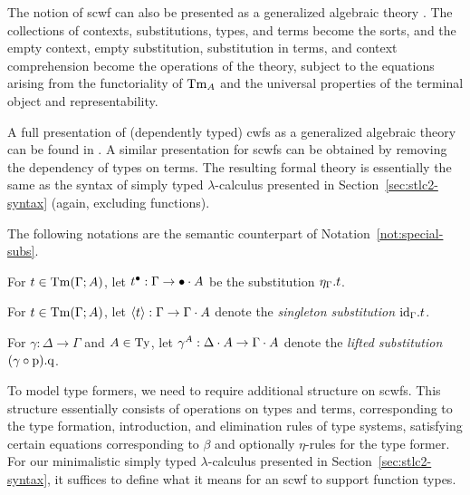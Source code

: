 \begin{rem}
The notion of scwf can also be presented as a generalized algebraic theory \cite{cartmell:1986:apal}. The collections of contexts, substitutions, types, and terms become the sorts, and the empty context, empty substitution, substitution in terms, and context comprehension become the operations of the theory, subject to the equations arising from the functoriality of $\STm{A}$ and the universal properties of the terminal object and representability.

A full presentation of (dependently typed) cwfs as a generalized algebraic theory can be found in \cite{dybjer:1996:types}. A similar presentation for scwfs can be obtained by removing the dependency of types on terms. The resulting formal theory is essentially the same as the syntax of simply typed $\lambda$-calculus presented in Section~\ref{sec:stlc2-syntax} (again, excluding functions).
\end{rem}

The following notations are the semantic counterpart of Notation~\ref{not:special-subs}.
\begin{notn}
\begin{enum}
\item For $t \in \STm[\Gamma]{A}$, let $\Stmsub{t} : \Gamma \to \Sextcon{\Sempcon}{A}$ be the substitution $\Sextsub{\Sempsub[\Gamma]}{t}$.
\item For $t \in \STm[\Gamma]{A}$, let $\Ssingsub{t} : \Gamma \to \Sextcon{\Gamma}{A}$ denote the \emph{singleton substitution} $\Sextsub{\Sidsub[\Gamma]}{t}$.
\item For $\gamma : \Delta \to \Gamma$ and $A \in \STy$, let $\Sliftsub[A]{\gamma} : \Sextcon{\Delta}{A} \to \Sextcon{\Gamma}{A}$ denote the \emph{lifted substitution} $\Sextsub{(\Scompsub{\gamma}{\Spsub})}{\Sq}$.
\end{enum}
\end{notn}

To model type formers, we need to require additional structure on scwfs. This structure essentially consists of operations on types and terms, corresponding to the type formation, introduction, and elimination rules of type systems, satisfying certain equations corresponding to $\beta$ and optionally $\eta$-rules for the type former. For our minimalistic simply typed $\lambda$-calculus presented in Section~\ref{sec:stlc2-syntax}, it suffices to define what it means for an scwf to support function types.

